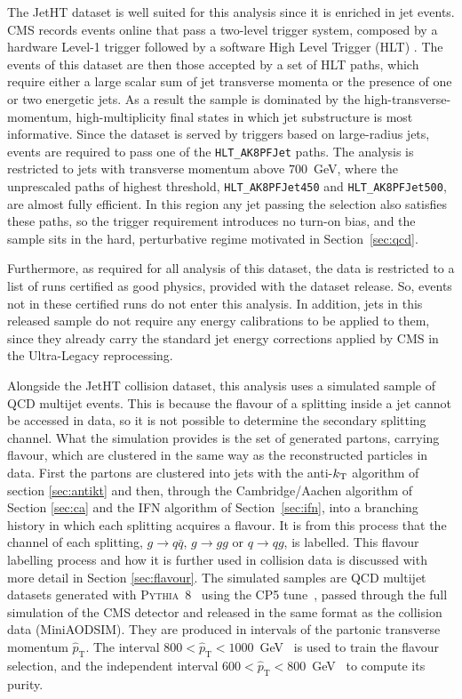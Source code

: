 The JetHT dataset is well suited for this analysis since it is enriched in jet events. CMS records
events online that pass a two-level trigger system, composed by a hardware Level-1 trigger followed by a software High Level Trigger
(HLT) \cite{CMS:2017trigger}. The events of this dataset are then those accepted by a set of HLT paths,
which require either a large scalar sum of jet transverse momenta
or the presence of one or two energetic jets. As a result the sample is dominated
by the high-transverse-momentum, high-multiplicity final states in which jet
substructure is most informative. Since the dataset is served by triggers based on large-radius jets, events are
required to pass one of the \texttt{HLT\_AK8PFJet} paths. The analysis is
restricted to jets with transverse momentum above $700$~GeV, where the
unprescaled paths of highest threshold, \texttt{HLT\_AK8PFJet450} and
\texttt{HLT\_AK8PFJet500}, are almost fully efficient. In this region any jet passing
the selection also satisfies these paths, so the trigger requirement introduces
no turn-on bias, and the sample sits in the hard, perturbative regime
motivated in Section~\ref{sec:qcd}.

Furthermore, as required for all analysis of this dataset, the data is restricted to a list of
runs certified as good physics, provided with the dataset release. So, events not in these
certified runs do not enter this analysis. In addition, jets in this released sample do not 
require any energy calibrations to be applied to them, since they already carry the standard jet energy corrections applied by CMS
in the Ultra-Legacy reprocessing.

Alongside the JetHT collision dataset, this analysis uses a simulated sample of QCD
multijet events. This is because the flavour of a splitting inside a jet cannot be accessed in data,
so it is not possible to determine the secondary splitting channel. What the simulation
provides is the set of generated partons, carrying flavour, which are clustered in the
same way as the reconstructed particles in data. First the partons are clustered into jets with the
anti-$k_{\mathrm{T}}$ algorithm of section \ref{sec:antikt} and then, through the Cambridge/Aachen algorithm of Section
\ref{sec:ca} and the IFN algorithm of Section~\ref{sec:ifn}, into a branching
history in which each splitting acquires a flavour. It is from this process that 
the channel of each splitting, $g\to q\bar{q}$, $g\to gg$ or $q\to qg$, is labelled. 
This flavour labelling process and how it is further used in collision data is discussed 
with more detail in Section \ref{sec:flavour}. 
The simulated samples are QCD multijet datasets generated with
\textsc{Pythia}~8~\cite{Sj_strand_2015} using the CP5
tune~\cite{CMS:2019csb}, passed through the full simulation of the CMS detector
and released in the same format as the collision data (MiniAODSIM). They are
produced in intervals of the partonic transverse momentum $\hat{p}_{\mathrm{T}}$.
The interval $800 < \hat{p}_{\mathrm{T}} < 1000$~GeV~\cite{QCDMC2016_800to1000}
is used to train the flavour selection, and the independent interval
$600 < \hat{p}_{\mathrm{T}} < 800$~GeV~\cite{QCDMC2016_600to800} to compute
its purity.

